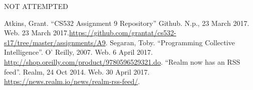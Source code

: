 \documentclass[letterpaper,11pt]{article}
\begin{document}
\begin{center}
\Huge{NOT ATTEMPTED}
\end{center}


\clearpage

\clearpage



\begin{thebibliography}{9}
Atkins, Grant. ``CS532 Assignment 9 Repository'' Github. N.p., 23 March 2017. Web. 23 March 2017.\url{https://github.com/grantat/cs532-s17/tree/master/assignments/A9}.
Segaran, Toby. ``Programming Collective Intelligence''. O' Reilly, 2007. Web. 6 April 2017. \url{http://shop.oreilly.com/product/9780596529321.do}.
``Realm now has an RSS feed''. Realm, 24 Oct 2014. Web. 30 April 2017. \url{https://news.realm.io/news/realm-rss-feed/}.
\end{thebibliography}
\end{document}
